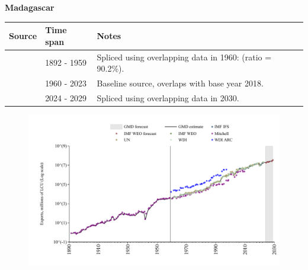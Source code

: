 \documentclass[12pt,a4paper,landscape]{article}
\begin{document}
\begin{adjustbox}{max totalsize={\paperwidth}{\paperheight},center}
\begin{minipage}[t][\textheight][t]{\textwidth}
\vspace*{0.5cm}
{}
\begin{center}
{\Large\bfseries Madagascar}
\end{center}
\vspace{0.5cm}
\begin{table}[H]
\centering
\small
\begin{tabular}{|l|l|l|}
\hline
\textbf{Source} & \textbf{Time span} & \textbf{Notes} \\
\hline
\rowcolor{white}\cite{Mitchell}& 1892 - 1959 &Spliced using overlapping data in 1960: (ratio = 90.2\%).\\
\rowcolor{lightgray}\cite{WDI}& 1960 - 2023 &Baseline source, overlaps with base year 2018.\\
\rowcolor{white}\cite{IMF_WEO_forecast}& 2024 - 2029 &Spliced using overlapping data in 2030.\\
\hline
\end{tabular}
\end{table}
\begin{figure}[H]
\centering
\includegraphics[width=\textwidth,height=0.6\textheight,keepaspectratio]{graphs/MDG_exports.pdf}
\end{figure}
\end{minipage}
\end{adjustbox}
\end{document}
